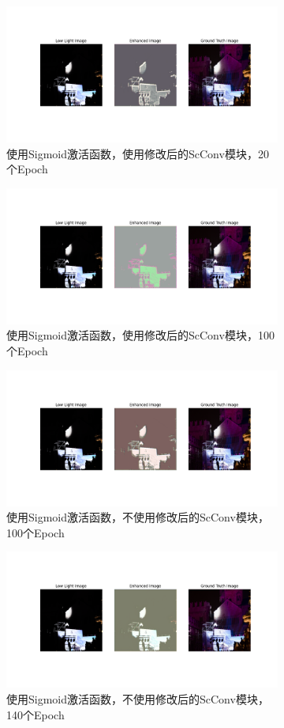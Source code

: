 \documentclass[a4paper]{ctexart}
\begin{document}
		
		\begin{figure}[htb]
			\centering
			\begin{subfigure}{\textwidth}
				\centering
				\includegraphics[width=0.4\linewidth]{picture/LLIE/Experiment/myplot_Sigmoid_ScConv_Epoch20}
				\captionsetup{font=scriptsize}
				\caption{使用Sigmoid激活函数，使用修改后的ScConv模块，20个Epoch}
				\label{fig: myplot_Sigmoid_ScConv_Epoch20}
			\end{subfigure}
			\begin{subfigure}{\textwidth}
				\centering
				\includegraphics[width=0.4\linewidth]{picture/LLIE/Experiment/myplot_Sigmoid_ScConv_Epoch100}
				\captionsetup{font=scriptsize}
				\caption{使用Sigmoid激活函数，使用修改后的ScConv模块，100个Epoch}
				\label{fig: myplot_Sigmoid_ScConv_Epoch100}	
			\end{subfigure}
			\begin{subfigure}{\textwidth}
				\centering
				\includegraphics[width=0.4\linewidth]{picture/LLIE/Experiment/myplot_Sigmoid_without_ScConv_Epoch100}
				\captionsetup{font=scriptsize}
				\caption{使用Sigmoid激活函数，不使用修改后的ScConv模块，100个Epoch}
				\label{fig: myplot_Sigmoid_without_ScConv_Epoch100}	
			\end{subfigure}
			\begin{subfigure}{\textwidth}
				\centering
				\includegraphics[width=0.4\linewidth]{picture/LLIE/Experiment/myplot_Sigmoid_without_ScConv_Epoch140}
				\captionsetup{font=scriptsize}
				\caption{使用Sigmoid激活函数，不使用修改后的ScConv模块，140个Epoch}
				\label{fig: myplot_Sigmoid_without_ScConv_Epoch140}	
			\end{subfigure}
			\caption{
				\label{fig: dark}
			}
		\end{figure}
		
\end{document}
